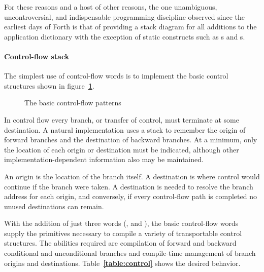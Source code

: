 For these reasons and a host of other reasons, the one unambiguous,
uncontroversial, and indispensable programming discipline observed
since the earliest days of Forth is that of providing a stack diagram
for all additions to the application dictionary with the exception of
static constructs such as s and s.

\setcounter{paragraph}{1}
\paragraph{Control-flow stack} %

The simplest use of control-flow words is to implement the basic
control structures shown in figure~\textbf{\ref{fig:basic}}.

\begin{figure}[ht]
  \begin{center}
	\caption{The basic control-flow patterns}
	\label{fig:basic}
  \end{center}
\end{figure}

In control flow every branch, or transfer of control, must terminate
at some destination. A natural implementation uses a stack to
remember the origin of forward branches and the destination of
backward branches. At a minimum, only the location of each origin or
destination must be indicated, although other implementation-dependent
information also may be maintained.

An origin is the location of the branch itself. A destination is
where control would continue if the branch were taken. A destination
is needed to resolve the branch address for each origin, and conversely,
if every control-flow path is completed no unused destinations can
remain.

With the addition of just three words (,
 and ), the basic control-flow
words supply the primitives necessary to compile a variety of transportable
control structures. The abilities required are compilation of forward
and backward conditional and unconditional branches and compile-time
management of branch origins and destinations.
Table~\textbf{\ref{table:control}} shows the desired behavior.


